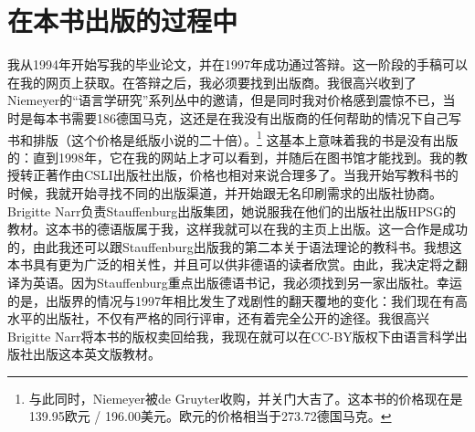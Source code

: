 \section*{在本书出版的过程中}

我从1994年开始写我的毕业论文，并在1997年成功通过答辩。这一阶段的手稿可以在我的网页上获取。在答辩之后，我必须要找到出版商。我很高兴收到了Niemeyer的“语言学研究”系列丛中的邀请，但是同时我对价格感到震惊不已，当时是每本书需要186德国马克，这还是在我没有出版商的任何帮助的情况下自己写书和排版（这个价格是纸版小说的二十倍）。\footnote{
与此同时，Niemeyer被de Gruyter收购，并关门大吉了。这本书的价格现在是139.95欧元 / 196.00美元。欧元的价格相当于273.72德国马克。
} 这基本上意味着我的书是没有出版的：直到1998年，它在我的网站上才可以看到，并随后在图书馆才能找到。我的教授转正著作由CSLI出版社出版，价格也相对来说合理多了。当我开始写教科书的时候，我就开始寻找不同的出版渠道，并开始跟无名印刷需求的出版社协商。Brigitte Narr负责Stauffenburg出版集团，她说服我在他们的出版社出版HPSG的教材。这本书的德语版属于我，这样我就可以在我的主页上出版。这一合作是成功的，由此我还可以跟Stauffenburg出版我的第二本关于语法理论的教科书。我想这本书具有更为广泛的相关性，并且可以供非德语的读者欣赏。由此，我决定将之翻译为英语。因为Stauffenburg重点出版德语书记，我必须找到另一家出版社。幸运的是，出版界的情况与1997年相比发生了戏剧性的翻天覆地的变化：我们现在有高水平的出版社，不仅有严格的同行评审，还有着完全公开的途径。我很高兴Brigitte Narr将本书的版权卖回给我，我现在就可以在CC-BY版权下由语言科学出版社出版这本英文版教材。
